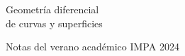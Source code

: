 \documentclass[oneside,11pt]{memoir}
\begin{document}
\thispagestyle{empty}

\begin{center}


{\huge Geometría diferencial\\[0.75ex] de curvas y superficies}

\vspace*{4ex}

Notas del verano académico IMPA 2024\\

\vspace*{5 ex}


\begin{tikzpicture}[x=0.6pt,y=0.6pt,yscale=-1,xscale=1]


\end{tikzpicture}
\end{center}
\end{document}

